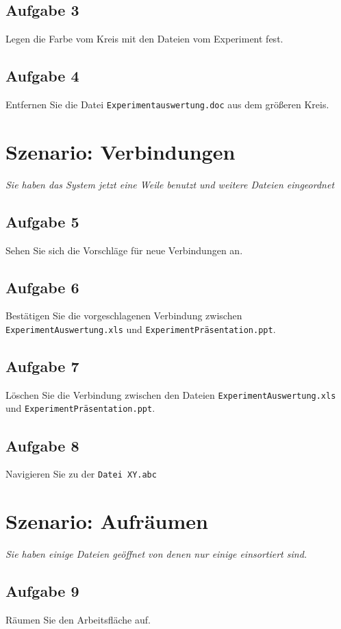 \documentclass[12pt,]{article}
\begin{document}
\newpage

\subsection{Aufgabe 3}

Legen die Farbe vom Kreis mit den Dateien vom Experiment fest.

\newpage

\subsection{Aufgabe 4}

Entfernen Sie die Datei \texttt{Experimentauswertung.doc} aus dem
größeren Kreis.

\newpage

\section{Szenario: Verbindungen}

\emph{Sie haben das System jetzt eine Weile benutzt und weitere Dateien
eingeordnet}

\subsection{Aufgabe 5}

Sehen Sie sich die Vorschläge für neue Verbindungen an.

\newpage

\subsection{Aufgabe 6}

Bestätigen Sie die vorgeschlagenen Verbindung zwischen
\texttt{ExperimentAuswertung.xls} und
\texttt{ExperimentPräsentation.ppt}.

\newpage

\subsection{Aufgabe 7}

Löschen Sie die Verbindung zwischen den Dateien
\texttt{ExperimentAuswertung.xls} und
\texttt{ExperimentPräsentation.ppt}.

\newpage

\subsection{Aufgabe 8}

Navigieren Sie zu der \texttt{Datei XY.abc}

\newpage

\section{Szenario: Aufräumen}

\emph{Sie haben einige Dateien geöffnet von denen nur einige einsortiert
sind.}

\subsection{Aufgabe 9}

Räumen Sie den Arbeitsfläche auf.
\end{document}
